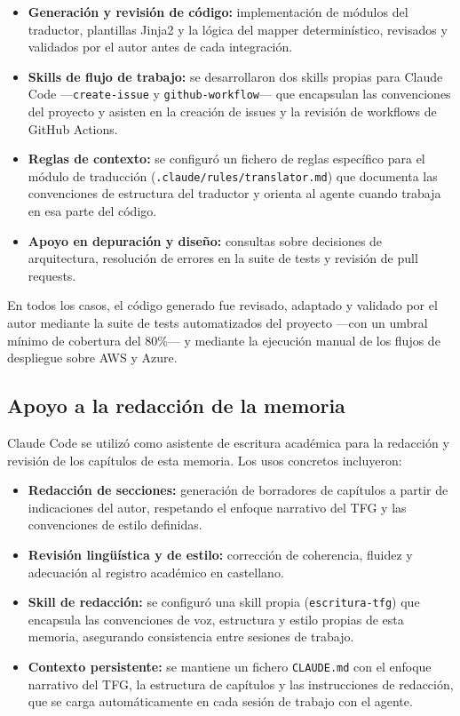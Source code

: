 \begin{itemize}
    \item \textbf{Generación y revisión de código:} implementación de módulos del traductor,
    plantillas Jinja2 y la lógica del mapper determinístico, revisados y validados por el
    autor antes de cada integración.
    \item \textbf{Skills de flujo de trabajo:} se desarrollaron dos skills propias para
    Claude Code —\texttt{create-issue} y \texttt{github-workflow}— que encapsulan las
    convenciones del proyecto y asisten en la creación de issues y la revisión de workflows
    de GitHub Actions.
    \item \textbf{Reglas de contexto:} se configuró un fichero de reglas específico para
    el módulo de traducción (\texttt{.claude/rules/translator.md}) que documenta las
    convenciones de estructura del traductor y orienta al agente cuando trabaja en esa
    parte del código.
    \item \textbf{Apoyo en depuración y diseño:} consultas sobre decisiones de arquitectura,
    resolución de errores en la suite de tests y revisión de pull requests.
\end{itemize}

En todos los casos, el código generado fue revisado, adaptado y validado por el autor
mediante la suite de tests automatizados del proyecto —con un umbral mínimo de cobertura
del 80\%— y mediante la ejecución manual de los flujos de despliegue sobre AWS y Azure.

\subsection*{Apoyo a la redacción de la memoria}

Claude Code se utilizó como asistente de escritura académica para la redacción y revisión
de los capítulos de esta memoria. Los usos concretos incluyeron:

\begin{itemize}
    \item \textbf{Redacción de secciones:} generación de borradores de capítulos a partir
    de indicaciones del autor, respetando el enfoque narrativo del TFG y las convenciones
    de estilo definidas.
    \item \textbf{Revisión lingüística y de estilo:} corrección de coherencia, fluidez y
    adecuación al registro académico en castellano.
    \item \textbf{Skill de redacción:} se configuró una skill propia (\texttt{escritura-tfg})
    que encapsula las convenciones de voz, estructura y estilo propias de esta memoria,
    asegurando consistencia entre sesiones de trabajo.
    \item \textbf{Contexto persistente:} se mantiene un fichero \texttt{CLAUDE.md} con el
    enfoque narrativo del TFG, la estructura de capítulos y las instrucciones de redacción,
    que se carga automáticamente en cada sesión de trabajo con el agente.
\end{itemize}


